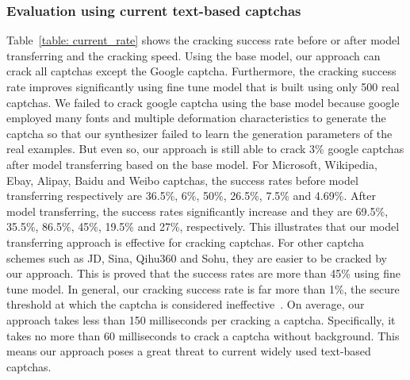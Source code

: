 \subsubsection{Evaluation using current text-based captchas}
Table~\ref{table: current_rate} shows the cracking success rate before or after model transferring and the cracking speed. Using the base model, our approach can crack all captchas except the Google captcha. Furthermore, the cracking success rate improves significantly using fine tune model that is built using only 500 real captchas. We failed to crack google captcha using the base model because google employed many fonts and multiple deformation characteristics to generate the captcha so that our synthesizer failed to learn the generation parameters of the real examples. But even so, our approach is still able to crack 3\% google captchas after model transferring based on the base model. For Microsoft, Wikipedia, Ebay, Alipay, Baidu and Weibo captchas, the success rates before model transferring respectively are 36.5\%, 6\%, 50\%, 26.5\%, 7.5\% and 4.69\%. After model transferring, the success rates significantly increase and they are 69.5\%, 35.5\%, 86.5\%, 45\%, 19.5\% and 27\%, respectively. This illustrates that our model transferring approach is effective for cracking captchas. For other captcha schemes such as JD, Sina, Qihu360 and Sohu, they are easier to be cracked by our approach. This is proved that the success rates are more than 45\% using fine tune model. In general, our cracking success rate is far more than 1\%, the secure threshold at which the captcha is considered ineffective~\cite{Bursztein2011Text}. On average, our approach takes less than 150 milliseconds per cracking a captcha. Specifically, it takes no more than 60 milliseconds to crack a captcha without background. This means our approach poses a great threat to current widely used text-based captchas.


